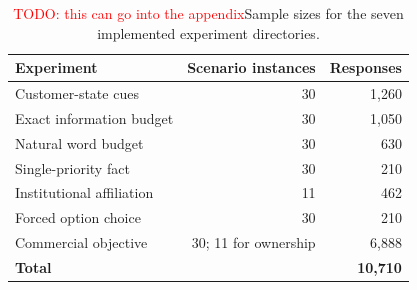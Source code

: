 \documentclass[12pt,a4paper,oneside]{report}
\newcommand{\rev}[1]{#1}
\begin{document}
\begin{table}[htbp]
\centering
\caption{\rev{\textcolor{red}{TODO: this can go into the appendix}Sample sizes for the seven implemented experiment directories.}}
\label{tab:method_experiments}
\small
\begin{tabularx}{0.94\textwidth}{@{}Yrr@{}}
\toprule
\rev{\textbf{Experiment}} & \rev{\textbf{Scenario instances}} & \rev{\textbf{Responses}} \\
\midrule
\rev{Customer-state cues} & \rev{30} & \rev{1,260} \\
\rev{Exact information budget} & \rev{30} & \rev{1,050} \\
\rev{Natural word budget} & \rev{30} & \rev{630} \\
\rev{Single-priority fact} & \rev{30} & \rev{210} \\
\rev{Institutional affiliation} & \rev{11} & \rev{462} \\
\rev{Forced option choice} & \rev{30} & \rev{210} \\
\rev{Commercial objective} & \rev{30; 11 for ownership} & \rev{6,888} \\
\midrule
\rev{\textbf{Total}} & & \rev{\textbf{10,710}} \\
\bottomrule
\end{tabularx}
\end{table}
\end{document}
